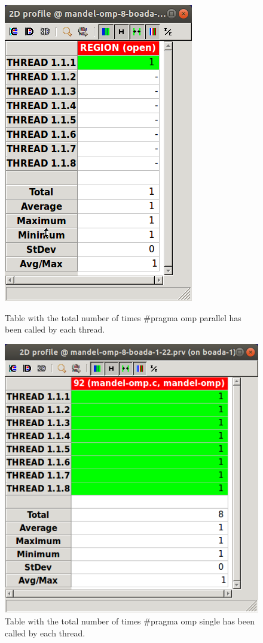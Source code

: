 \documentclass[12pt, a4paper]{article}
\begin{document}
\begin{figure}[H]
\centering
\begin{minipage}[t]{0.4\linewidth}
  \centering
  \includegraphics[scale=0.40]{./mandel-omp-22-parallel}
  \caption{Table with the total number of times \#pragma omp parallel has been called by each thread.}
  \label{fig:mandel-omp-22-parallel}
\end{minipage}%
\hspace{0.5cm}
\begin{minipage}[t]{0.4\linewidth}
  \centering
  \includegraphics[scale=0.40]{./mandel-omp-22-single}
  \caption{Table with the total number of times \#pragma omp single has been called by each thread.}
  \label{fig:mandel-omp-22-single}
\end{minipage}
\end{figure}
\end{document}
